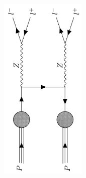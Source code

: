\begin{figure}
{\begin{subfigure}{.5\textwidth}
            \caption{}
            \label{fig:ttbar}
        \end{subfigure}
        \hspace{1.5cm}
        \begin{subfigure}{.5\textwidth}
            \includegraphics[width=0.45\textwidth, angle = -90]{Figures/FDiagrams/zz.png}
            \caption{}
            \label{fig:zz}
        \end{subfigure}
    }
    \\
    \newline
\end{figure}
